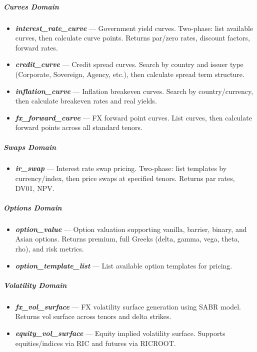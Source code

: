 \documentclass[11pt]{article}
\begin{document}
\subparagraph{Curves Domain}\mbox{}\par
\begin{itemize}[leftmargin=*,itemsep=2pt,topsep=2pt]
\item {} \textbf{\emph{interest\_\allowbreak{}rate\_\allowbreak{}curve}} — Government yield curves. Two-phase: list available curves, then calculate curve points. Returns par/zero rates, discount factors, forward rates.
\item {} \textbf{\emph{credit\_\allowbreak{}curve}} — Credit spread curves. Search by country and issuer type (Corporate, Sovereign, Agency, etc.), then calculate spread term structure.
\item {} \textbf{\emph{inflation\_\allowbreak{}curve}} — Inflation breakeven curves. Search by country/currency, then calculate breakeven rates and real yields.
\item {} \textbf{\emph{fx\_\allowbreak{}forward\_\allowbreak{}curve}} — FX forward point curves. List curves, then calculate forward points across all standard tenors.
\end{itemize}

\subparagraph{Swaps Domain}\mbox{}\par
\begin{itemize}[leftmargin=*,itemsep=2pt,topsep=2pt]
\item {} \textbf{\emph{ir\_\allowbreak{}swap}} — Interest rate swap pricing. Two-phase: list templates by currency/index, then price swaps at specified tenors. Returns par rates, DV01, NPV.
\end{itemize}

\subparagraph{Options Domain}\mbox{}\par
\begin{itemize}[leftmargin=*,itemsep=2pt,topsep=2pt]
\item {} \textbf{\emph{option\_\allowbreak{}value}} — Option valuation supporting vanilla, barrier, binary, and Asian options. Returns premium, full Greeks (delta, gamma, vega, theta, rho), and risk metrics.
\item {} \textbf{\emph{option\_\allowbreak{}template\_\allowbreak{}list}} — List available option templates for pricing.
\end{itemize}

\subparagraph{Volatility Domain}\mbox{}\par
\begin{itemize}[leftmargin=*,itemsep=2pt,topsep=2pt]
\item {} \textbf{\emph{fx\_\allowbreak{}vol\_\allowbreak{}surface}} — FX volatility surface generation using SABR model. Returns vol surface across tenors and delta strikes.
\item {} \textbf{\emph{equity\_\allowbreak{}vol\_\allowbreak{}surface}} — Equity implied volatility surface. Supports equities/indices via RIC and futures via RICROOT.
\end{itemize}
\end{document}
